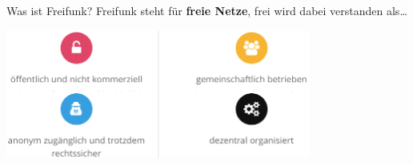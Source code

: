 \documentclass[10pt]{beamer}
\begin{document}
    \begin{frame}{Was ist Freifunk?}
      Freifunk steht für \textbf{freie Netze}, frei wird dabei verstanden als\ldots
      \begin{center}
        \includegraphics[width=10cm]{images/principles}\\
      \end{center}
    \end{frame}
\end{document}
